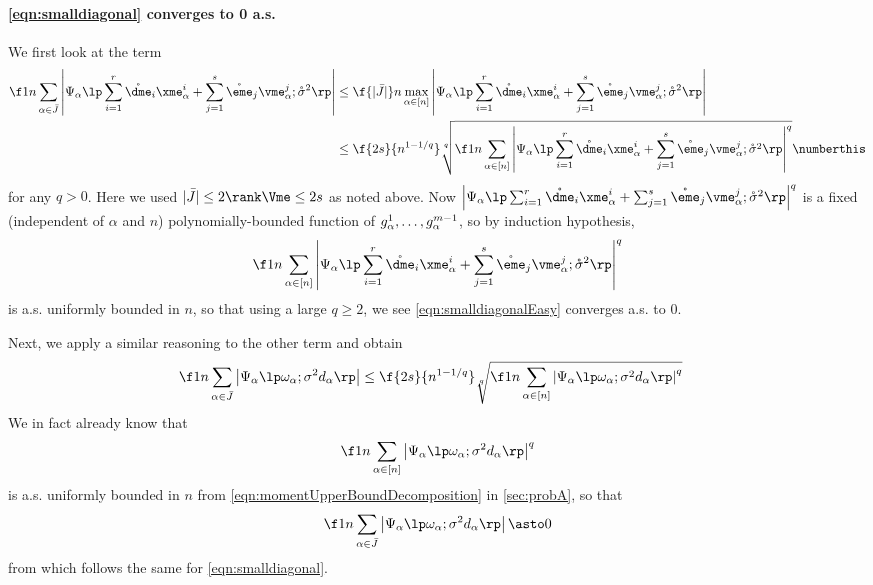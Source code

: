 \documentclass[main.tex]{subfiles}
\begin{document}
\paragraph{\cref{eqn:smalldiagonal} converges to 0 a.s.}
We first look at the term
\begin{align*}
\f 1 n
\sum_{\alpha\in \JJ}
\left|\Psi_\alpha\lp
            \sum_{i=1}^r \mathring {\dme}_i \xme^i_\alpha +
              \sum_{j=1}^s \mathring {\eme}_j \vme^j_\alpha
              ;
              \mathring \sigma^2
            \rp
\right|
&\le
    \f{|\JJ|}n \max_{\alpha \in [n]}
        \left|\Psi_\alpha\lp 
              \sum_{i=1}^r \mathring {\dme}_i \xme^i_\alpha +
                \sum_{j=1}^s \mathring {\eme}_j \vme^j_\alpha
                ; \mathring \sigma^2 \rp\right|
    \\
&\le
    \f{2s}{n^{1-1/q}} \sqrt[q]{\f 1 n \sum_{\alpha \in [n]} \left|\Psi_\alpha\lp
              \sum_{i=1}^r \mathring {\dme}_i \xme^i_\alpha +
                \sum_{j=1}^s \mathring {\eme}_j \vme^j_\alpha
              ; \mathring \sigma^2
            \rp
          \right|^q}
    \numberthis\label{eqn:smalldiagonalEasy}
\end{align*}
for any $q > 0$.
Here we used  $|\JJ| \le 2 \rank \Vme \le 2 s$ as noted above.
Now $\left|\Psi_\alpha\lp 
\sum_{i=1}^r \mathring {\dme}_i \xme^i_\alpha +
\sum_{j=1}^s \mathring {\eme}_j \vme^j_\alpha;
\mathring \sigma^2 \rp\right|^q$
is a fixed (independent of $\alpha$ and $n$) polynomially-bounded function of $g^1_\alpha, \ldots, g^{m-1}_\alpha$, so by induction hypothesis, 
\[\f 1 n \sum_{\alpha \in [n]} \left|\Psi_\alpha\lp
  \sum_{i=1}^r \mathring {\dme}_i \xme^i_\alpha +
    \sum_{j=1}^s \mathring {\eme}_j \vme^j_\alpha
; \mathring \sigma^2 \rp\right|^q\]
is a.s. uniformly bounded in $n$, so that using a large $q \ge 2$, we see \cref{eqn:smalldiagonalEasy} converges a.s. to 0.

Next, we apply a similar reasoning to the other term and obtain
\begin{align*}
\f 1 n
\sum_{\alpha\in \JJ}
\left|\Psi_\alpha\lp \omega_\alpha; \sigma^2 d_\alpha\rp\right|
&\le
    \f{2s}{n^{1-1/q}} \sqrt[q]{\f 1 n \sum_{\alpha \in [n]}
    \left|\Psi_\alpha\lp \omega_\alpha; \sigma^2 d_\alpha\rp\right|^q
    }
\end{align*}
We in fact already know that
\[\f 1 n \sum_{\alpha \in [n]}
    \left|\Psi_\alpha\lp \omega_\alpha; \sigma^2 d_\alpha\rp\right|^q\]
is a.s. uniformly bounded in $n$
from \cref{eqn:momentUpperBoundDecomposition} in \cref{sec:probA}, so that 
\[
\f 1 n
\sum_{\alpha\in \JJ}
\left|\Psi_\alpha\lp \omega_\alpha; \sigma^2 d_\alpha\rp\right|
\asto 0\]
from which follows the same for \cref{eqn:smalldiagonal}.
\end{document}
